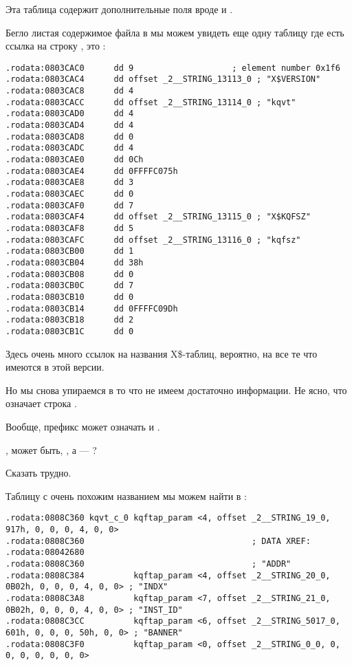 Эта таблица содержит дополнительные поля вроде  и .

Бегло листая содержимое файла  в \IDA мы можем увидеть еще одну таблицу где есть ссылка на строку , это :

\begin{lstlisting}[caption=kqf.o]
.rodata:0803CAC0      dd 9                    ; element number 0x1f6
.rodata:0803CAC4      dd offset _2__STRING_13113_0 ; "X$VERSION"
.rodata:0803CAC8      dd 4
.rodata:0803CACC      dd offset _2__STRING_13114_0 ; "kqvt"
.rodata:0803CAD0      dd 4
.rodata:0803CAD4      dd 4
.rodata:0803CAD8      dd 0
.rodata:0803CADC      dd 4
.rodata:0803CAE0      dd 0Ch
.rodata:0803CAE4      dd 0FFFFC075h
.rodata:0803CAE8      dd 3
.rodata:0803CAEC      dd 0
.rodata:0803CAF0      dd 7
.rodata:0803CAF4      dd offset _2__STRING_13115_0 ; "X$KQFSZ"
.rodata:0803CAF8      dd 5
.rodata:0803CAFC      dd offset _2__STRING_13116_0 ; "kqfsz"
.rodata:0803CB00      dd 1
.rodata:0803CB04      dd 38h
.rodata:0803CB08      dd 0
.rodata:0803CB0C      dd 7
.rodata:0803CB10      dd 0
.rodata:0803CB14      dd 0FFFFC09Dh
.rodata:0803CB18      dd 2
.rodata:0803CB1C      dd 0
\end{lstlisting}

Здесь очень много ссылок на названия X\$-таблиц, вероятно, на все те что имеются в \oracle этой версии.

Но мы снова упираемся в то что не имеем достаточно информации.
Не ясно, что означает строка .
 
Вообще, префикс  может означать  и .
 
, может быть, , а  --- ?
 
Сказать трудно.

Таблицу с очень похожим названием мы можем найти в :

\begin{lstlisting}[caption=kqf.o]
.rodata:0808C360 kqvt_c_0 kqftap_param <4, offset _2__STRING_19_0, 917h, 0, 0, 0, 4, 0, 0>
.rodata:0808C360                                  ; DATA XREF: .rodata:08042680
.rodata:0808C360                                  ; "ADDR"
.rodata:0808C384          kqftap_param <4, offset _2__STRING_20_0, 0B02h, 0, 0, 0, 4, 0, 0> ; "INDX"
.rodata:0808C3A8          kqftap_param <7, offset _2__STRING_21_0, 0B02h, 0, 0, 0, 4, 0, 0> ; "INST_ID"
.rodata:0808C3CC          kqftap_param <6, offset _2__STRING_5017_0, 601h, 0, 0, 0, 50h, 0, 0> ; "BANNER"
.rodata:0808C3F0          kqftap_param <0, offset _2__STRING_0_0, 0, 0, 0, 0, 0, 0, 0>
\end{lstlisting}

